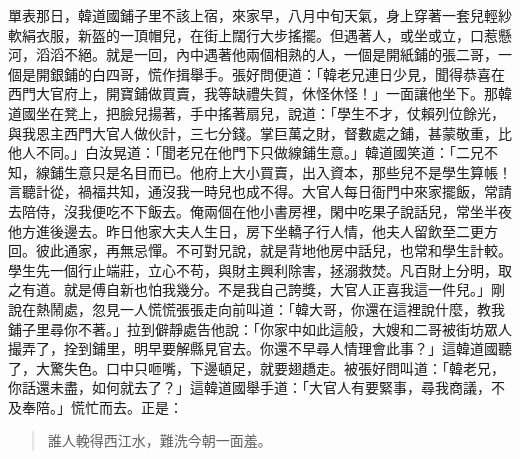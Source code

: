 單表那日，韓道國鋪子里不該上宿，來家早，八月中旬天氣，身上穿著一套兒輕紗軟絹衣服，新盔的一頂帽兒，在街上闊行大步搖擺。但遇著人，或坐或立，口惹懸河，滔滔不絕。就是一回，內中遇著他兩個相熟的人，一個是開紙鋪的張二哥，一個是開銀鋪的白四哥，慌作揖舉手。張好問便道：「韓老兄連日少見，聞得恭喜在西門大官府上，開寶鋪做買賣，我等缺禮失賀，休怪休怪！」一面讓他坐下。那韓道國坐在凳上，把臉兒揚著，手中搖著扇兒，說道：「學生不才，仗賴列位餘光，與我恩主西門大官人做伙計，三七分錢。掌巨萬之財，督數處之鋪，甚蒙敬重，比他人不同。」白汝晃道：「聞老兄在他門下只做線鋪生意。」韓道國笑道：「二兄不知，線鋪生意只是名目而已。他府上大小買賣，出入資本，那些兒不是學生算帳！言聽計從，禍福共知，通沒我一時兒也成不得。大官人每日衙門中來家擺飯，常請去陪侍，沒我便吃不下飯去。俺兩個在他小書房裡，閑中吃果子說話兒，常坐半夜他方進後邊去。昨日他家大夫人生日，房下坐轎子行人情，他夫人留飲至二更方回。彼此通家，再無忌憚。不可對兄說，就是背地他房中話兒，也常和學生計較。學生先一個行止端莊，立心不苟，與財主興利除害，拯溺救焚。凡百財上分明，取之有道。就是傅自新也怕我幾分。不是我自己誇獎，大官人正喜我這一件兒。」剛說在熱鬧處，忽見一人慌慌張張走向前叫道：「韓大哥，你還在這裡說什麼，教我鋪子里尋你不著。」拉到僻靜處告他說：「你家中如此這般，大嫂和二哥被街坊眾人撮弄了，拴到鋪里，明早要解縣見官去。你還不早尋人情理會此事？」這韓道國聽了，大驚失色。口中只咂嘴，下邊頓足，就要翅趫走。被張好問叫道：「韓老兄，你話還未盡，如何就去了？」這韓道國舉手道：「大官人有要緊事，尋我商議，不及奉陪。」慌忙而去。正是：
\begin{quote}
誰人輓得西江水，難洗今朝一面羞。
\end{quote}
